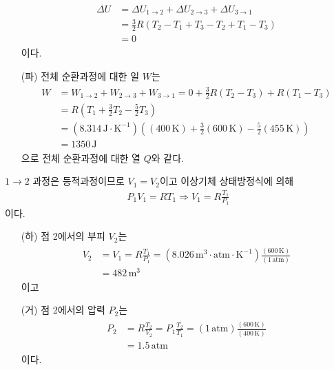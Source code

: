 \documentclass[floatfix,nofootinbib,superscriptaddress,fleqn]{revtex4}
\begin{document}
\begin{itemize}
\begin{align}
    \begin{split}
      \Delta U &= \Delta U_{1\to 2}+ \Delta U_{2\to 3}+ \Delta U_{3\to 1} \\
      &= \frac{3}{2}R(T_2-T_1+T_3-T_2+T_1-T_3)  \\
      &= 0
    \end{split}
  \end{align}
  이다.
  \item[(파)] 전체 순환과정에 대한 일 $W$는
  \begin{align}
    \begin{split}
      W &= W_{1\to 2}+W_{2\to 3}+W_{3\to 1}
      =0+ \frac{3}{2}R(T_2-T_3) + R(T_1-T_3)  \\
      &= R\left(T_1 +\frac{3}{2}T_2 -\frac{5}{2}T_3\right)  \\
      &= (8.314\,\mathrm{J\cdot K^{-1}})
      \left((400\,\mathrm{K}) + \frac{3}{2}(600\,\mathrm{K}) 
      - \frac{5}{2}(455\,\mathrm{K})\right)  \\
      &=1350\,\mathrm{J}
    \end{split}
  \end{align}
  으로 전체 순환과정에 대한 열 $Q$와 같다.
\end{itemize}
$1\to 2$ 과정은 등적과정이므로 $V_1=V_2$이고 이상기체 상태방정식에 의해
\begin{align}
  P_1V_1 = RT_1 \Longrightarrow V_1 = R\frac{T_1}{P_1}
\end{align}
이다.
\begin{itemize}
  \item[(하)] 점 2에서의 부피 $V_2$는
  \begin{align}
    \begin{split}
      V_2 &= V_1 = R\frac{T_1}{P_1} = (8.026\,\mathrm{m^3\cdot atm \cdot K^{-1}})
      \frac{(600\,\mathrm{K})}{(1\,\mathrm{atm})} \\
      &= 482\,\mathrm{m^3}
    \end{split}
  \end{align}
  이고
  \item[(거)] 
  점 2에서의 압력 $P_2$는
  \begin{align}
    \begin{split}
      P_2 &= R\frac{T_2}{V_2}=P_1\frac{T_2}{T_1} 
      = (1\,\mathrm{atm})\frac{(600\,\mathrm{K})}{(400\,\mathrm{K})} \\
      &= 1.5\,\mathrm{atm}
    \end{split}
  \end{align}
  이다.
\end{itemize}
\end{document}

